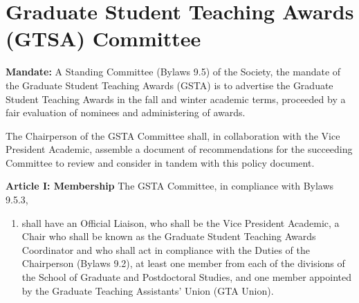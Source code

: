 \section{Graduate Student Teaching Awards (GTSA) Committee}

\textbf{Mandate:} A Standing Committee (Bylaws 9.5) of the Society, the mandate of the Graduate
Student Teaching Awards (GSTA) is to advertise the Graduate Student Teaching Awards in the fall
and winter academic terms, proceeded by a fair evaluation of nominees and administering of
awards.

The Chairperson of the GSTA Committee shall, in collaboration with the Vice President Academic,
assemble a document of recommendations for the succeeding Committee to review and consider
in tandem with this policy document.

\textbf{Article I: Membership}
The GSTA Committee, in compliance with Bylaws 9.5.3,
\begin{enumerate}
\item shall have an Official Liaison, who shall be the Vice President Academic, a Chair who shall be
known as the Graduate Student Teaching Awards Coordinator and who shall act in
compliance with the Duties of the Chairperson (Bylaws 9.2), at least one member from each
of the divisions of the School of Graduate and Postdoctoral Studies, and one member
appointed by the Graduate Teaching Assistants’ Union (GTA Union).
\end{enumerate}

